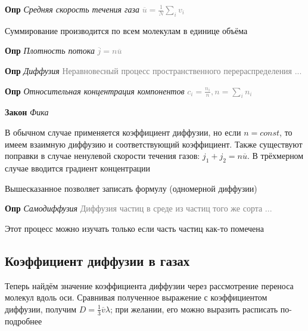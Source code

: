 \documentclass[a4paper, 14pt]{article}
\begin{document}
    \textbf{Опр} \textit{Средняя скорость течения газа} \textcolor{gray}{$\overline{u} = \frac{1}{N} \sum_i v_i$}

    Суммирование производится по всем молекулам в единице объёма

    \textbf{Опр} \textit{Плотность потока} \textcolor{gray}{$\overline{j} = n\overline{u}$}

    \textbf{Опр} \textit{Диффузия} \textcolor{gray}{Неравновесный процесс пространственного перераспределения ...}

    \textbf{Опр} \textit{Относительная концентрация компонентов} \textcolor{gray}{$c_i = \frac{n_i}{n}, n = \sum_i n_i$}

    \textbf{Закон} \textit{Фика}

    В обычном случае применяется коэффициент диффузии, но если $n = const$, то имеем взаимную диффузию и
    соответствующий коэффициент.
    Также существуют поправки в случае ненулевой скорости течения газов: $j_1 + j_2 = n \overline{u}$.
    В трёхмерном случае вводится градиент концентрации

    Вышесказанное позволяет записать формулу (одномерной диффузии)

    \textbf{Опр} \textit{Самодиффузия} \textcolor{gray}{Диффузия частиц в среде из частиц того же сорта ...}

    Этот процесс можно изучать только если часть частиц как-то помечена

    \subsection{Коэффициент диффузии в газах}

    Теперь найдём значение коэффициента диффузии через рассмотрение переноса молекул вдоль оси.
    Сравнивая полученное выражение с коэффициентом диффузии, получим $D = \frac{1}{3} \overline{v}\lambda$; при
    желании, его можно выразить расписать по-подробнее
\end{document}
